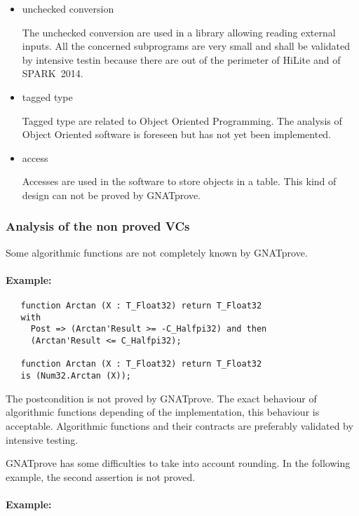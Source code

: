 \documentclass[10pt,a4paper,twocolumn]{article}
\newcommand{\gnatprove}{GNATprove\xspace}
\newcommand{\newspark}{SPARK~2014\xspace}
\begin{document}
\begin{itemize}
\item unchecked conversion

The unchecked conversion are used in a library allowing reading external inputs.
All the concerned subprograms are very small and shall be validated by intensive testin because there are out of the perimeter of HiLite and of \newspark.
\item tagged type

Tagged type are related to Object Oriented Programming. The analysis of Object Oriented software is foreseen but has not yet been implemented.
\item access

Accesses are used in the software to store objects in a table.
This kind of design can not be proved by \gnatprove.
\end{itemize}

\subsubsection{Analysis of the non proved VCs}

Some algorithmic functions are not completely known by \gnatprove.

\paragraph{Example:}

\begin{verbatim}
   function Arctan (X : T_Float32) return T_Float32
   with
     Post => (Arctan'Result >= -C_Halfpi32) and then
     (Arctan'Result <= C_Halfpi32);

   function Arctan (X : T_Float32) return T_Float32
   is (Num32.Arctan (X));
\end{verbatim}

The postcondition is not proved by \gnatprove.
The exact behaviour of algorithmic functions depending of the implementation, this behaviour is acceptable.
Algorithmic functions and their contracts are preferably validated by intensive testing.

\gnatprove has some difficulties to take into account rounding.
In the following example, the second assertion is not proved.

\paragraph{Example:}
\end{document}
